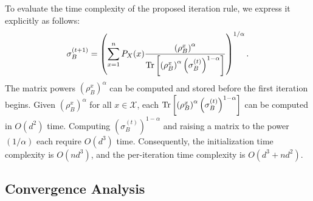 \documentclass{article}
\begin{document}
To evaluate the time complexity of the proposed iteration rule, we 
express it 
explicitly as follows:
\begin{align}
    \label{eq:DiscreteCP}
    \sigma_B^{(t + 1)} = \left(\sum_{x=1}^n P_X(x)\frac{ \left(\rho_B^x\right)^\alpha}{ \Tr\left[ \left(\rho_B^x\right)^\alpha \left(\sigma_B^{(t)}\right)^{1-\alpha} \right] }\right)^{1/\alpha}.
\end{align}
The matrix powers $\left(\rho_B^x\right)^\alpha$ can be computed and stored before the first iteration begins.
Given $\left(\rho_B^x\right)^\alpha$ for all $x \in \mathcal{X}$, each $\Tr\left[ \left(\rho_B^x\right)^\alpha \left(\sigma_B^{(t)}\right)^{1-\alpha} \right]$ can be computed in $O ( d^2 )$ time. 
Computing $\left(\sigma_B^{(t)}\right)^{1-\alpha}$ and raising a matrix to the power $(1 / \alpha)$ each require $O ( d^3 )$ time. 
Consequently, the initialization time complexity is $O\left(n d^{3}\right)$, and the per-iteration time complexity is $O\left(d^{3} + n d^{2}\right)$.

\subsection{Convergence Analysis}
\label{subsec:Conv}
\end{document}
